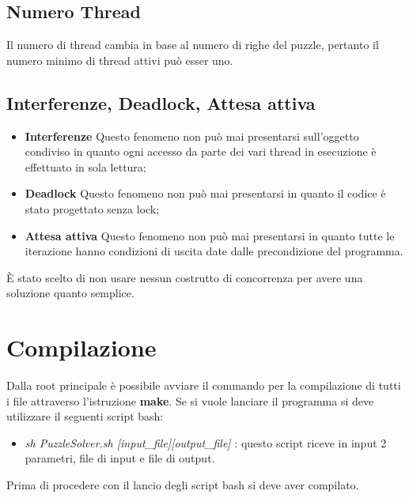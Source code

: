 \documentclass[13pt]{article}
\begin{document}
\subsection{Numero Thread}
Il numero di thread cambia in base al numero di righe del puzzle, pertanto il numero minimo di thread attivi può esser uno. 
\subsection{Interferenze, Deadlock, Attesa attiva}
\begin{itemize}
	\item \textbf{Interferenze}
	Questo fenomeno non può mai presentarsi sull'oggetto condiviso in quanto ogni accesso da parte dei vari thread in esecuzione è effettuato in sola lettura;
	\item \textbf{Deadlock}
	Questo fenomeno non può mai presentarsi in quanto il codice è stato progettato senza lock;
	\item \textbf{Attesa attiva}
	Questo fenomeno non può mai presentarsi in quanto tutte le iterazione hanno condizioni di uscita date dalle precondizione del programma.
\end{itemize}
È stato scelto di non usare nessun costrutto di concorrenza per avere una soluzione quanto semplice.

\section{Compilazione}
Dalla root principale è possibile avviare il commando per la compilazione di tutti i file attraverso l'istruzione \textbf{make}. Se si vuole lanciare il programma si deve utilizzare il seguenti script bash:
\begin{itemize}
	\item \textit{sh PuzzleSolver.sh [input\_file][output\_file]} : questo script riceve in input 2 parametri, file di input e file di output.
\end{itemize}
Prima di procedere con il lancio degli script bash si deve aver compilato.

 
\end{document}
